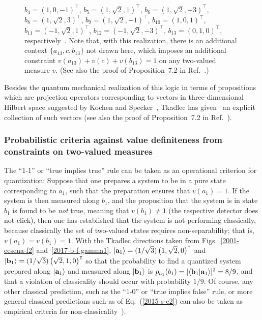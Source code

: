 \documentclass[%
  twocolumn,
 showpacs,
 showkeys,
 preprintnumbers,
 amsmath,amssymb,
 aps,
  pra,
  longbibliography,
 floatfix,
 ]{revtex4-1}
\begin{document}
\begin{figure}
{$b_{4}     = \left(    1,0,-1     \right)^\intercal $,
$b_{5}     = \left(    1,\sqrt{2},1     \right)^\intercal $,
$b_{6}     = \left(1, \sqrt{2}, -3 \right)^\intercal $,
$b_{8}     = \left(1, \sqrt{2}, 3 \right)^\intercal $,
$b_{9}     = \left(    1,\sqrt{2},-1     \right)^\intercal $,
$b_{10}     = \left(    1,0,1     \right)^\intercal $,
$b_{11}     = \left(    -1,\sqrt{2},1     \right)^\intercal $,
$b_{12}     = \left(-1, \sqrt{2}, -3 \right)^\intercal $,
$b_{13}     = \left(    0,1,0     \right)^\intercal $,
respectively~\cite[p.~206, Fig.~1]{tkadlec-96}.
Note that, with this realization, there is an additional context $\{ a_{13},c,b_{13}\}$ not drawn here,
which imposes an additional constraint $v(a_{13})+v(c)+v(b_{13})=1$ on any two-valued measure $v$.
(See also the proof of Proposition~7.2 in Ref.~\cite[p.~5392]{svozil-tkadlec}.)
}
\end{figure}

Besides the  quantum mechanical realization of this logic in terms of propositions which are projection operators
corresponding to vectors in three-dimensional Hilbert space suggested by Kochen and Specker~\cite{kochen1},
Tkadlec has given~\cite[p.~206, Fig.~1]{tkadlec-96}  an explicit collection of such vectors
(see also the proof of Proposition~7.2 in Ref.~\cite[p.~5392]{svozil-tkadlec}).


\subsubsection{Probabilistic criteria against value definiteness from constraints on two-valued measures}
\label{2017-b-ss-pc}

The ``1-1'' or  ``true implies true'' rule can be taken as an operational criterion for quantization:
Suppose that one prepares a system to be in a pure state
corresponding to $a_1$, such that the preparation ensures that $v(a_1)=1$.
If the system is then measured along $b_1$, and the proposition that
the system is in state $b_1$  is found  to be {\em not} true, meaning that $v(b_1)\neq 1$ (the respective detector does not click),
then  one has established that the system is not performing classically,
because classically the set of two-valued states requires non-separability; that is, $v(a_1)=v(b_1)=1$.
With the Tkadlec directions taken from Figs.~\ref{2001-cesena-f2} and~\ref{2017-b-f-gamma1},
$\vert {\bf a}_1\rangle = (1/\sqrt{3}) \left(    1,\sqrt{2},0     \right)^\intercal$ and
$\vert {\bf b}_1\rangle = (1/\sqrt{3})\left(     \sqrt{2},1,0      \right)^\intercal$
so that the probability to find a quantized system prepared along $\vert {\bf a}_1\rangle$
and measured along $\vert {\bf b}_1\rangle$ is
$p_{a_1}(b_1) = \vert \langle {\bf b}_1 \vert {\bf a}_1 \rangle \vert^2=  8/9  $,
and that a violation of classicality should occur with probability $1/9$.
Of course, any other classical prediction, such as the ``1-0'' or ``true implies false'' rule,
or more general  classical predictions such as of Eq.~(\ref{2015-s-e2})
can also be taken as empirical criteria for non-classicality~\cite[Sect.~11.3.2.]{svozil-2016-s}).
\end{document}
